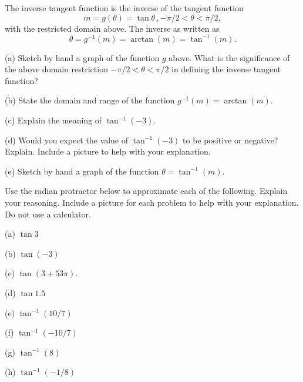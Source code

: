 \documentclass{ximera}
\begin{document}
The inverse tangent function is the inverse of the tangent function
\[
   m = g(\theta) = \tan \theta \, , -\pi/2 < \theta < \pi/2 ,
\]
with the restricted domain above. The inverse as written as
\[
    \theta = g^{-1}(m) = \arctan (m) = \tan^{-1}(m) .
\]

\begin{question} \label{Q12:InverseTrig}

(a) Sketch by hand a graph of the function $g$ above. What is the significance of the above domain restriction $-\pi/2 < \theta < \pi/2$  in defining the inverse tangent function?

(b) State the domain and range of the function $g^{-1}(m) = \arctan (m)$.

(c) Explain the meaning of $\tan^{-1}(-3)$.

(d) Would you expect the value of $\tan^{-1}(-3)$ to be positive or negative? Explain. Include a picture to help with your explanation.

(e) Sketch by hand a graph of the function $\theta =  \tan^{-1}(m) $.

\end{question}

\begin{question} \label{Q10:InverseTrig}
Use the radian protractor below to approximate each of the following. Explain your reasoning. Include a picture for each problem to help with your explanation. Do not use a calculator.

(a) $\tan 3$

(b) $\tan (-3)$

(c) $\tan (3+53\pi)$.

(d) $\tan 1.5$

(e) $\tan^{-1}(10/7)$

(f) $\tan^{-1}(-10/7)$

(g) $\tan^{-1}(8)$

(h) $\tan^{-1}(-1/8)$

\begin{exploration}\label{Exp3:Comp}

 
\begin{onlineOnly}
    \begin{center}
\end{center}
\end{onlineOnly}
\end{exploration}

\end{question}
\end{document}
